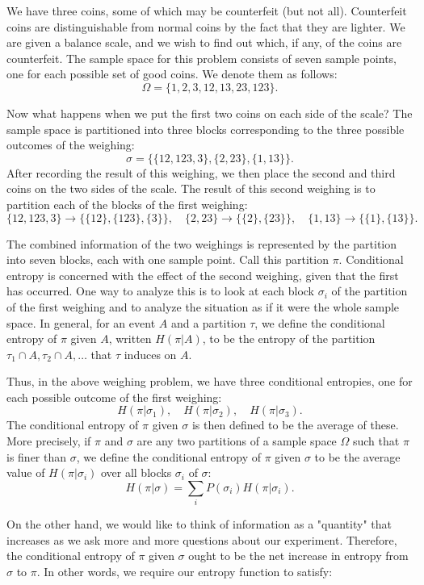 \documentclass{report}
\begin{document}
We have three coins, some of which may be counterfeit (but not all). Counterfeit coins are distinguishable from normal coins by the fact that they are lighter. We are given a balance scale, and we wish to find out which, if any, of the coins are counterfeit. The sample space for this problem consists of seven sample points, one for each possible set of good coins. We denote them as follows:
\[
\Omega = \{1, 2, 3, 12, 13, 23, 123\}.
\]

Now what happens when we put the first two coins on each side of the scale? The sample space is partitioned into three blocks corresponding to the three possible outcomes of the weighing:
\[
\sigma = \{\{12, 123, 3\}, \{2, 23\}, \{1, 13\}\}.
\]
After recording the result of this weighing, we then place the second and third coins on the two sides of the scale. The result of this second weighing is to partition each of the blocks of the first weighing:
\[
\{12, 123, 3\} \to \{\{12\}, \{123\}, \{3\}\}, \quad 
\{2, 23\} \to \{\{2\}, \{23\}\}, \quad 
\{1, 13\} \to \{\{1\}, \{13\}\}.
\]

The combined information of the two weighings is represented by the partition into seven blocks, each with one sample point. Call this partition \( \pi \). Conditional entropy is concerned with the effect of the second weighing, given that the first has occurred. One way to analyze this is to look at each block \( \sigma_i \) of the partition of the first weighing and to analyze the situation as if it were the whole sample space. In general, for an event \( A \) and a partition \( \tau \), we define the conditional entropy of \( \pi \) given \( A \), written \( H(\pi|A) \), to be the entropy of the partition \( \tau_1 \cap A, \tau_2 \cap A, \ldots \) that \( \tau \) induces on \( A \). 

Thus, in the above weighing problem, we have three conditional entropies, one for each possible outcome of the first weighing:
\[
H(\pi|\sigma_1), \quad H(\pi|\sigma_2), \quad H(\pi|\sigma_3).
\]
The conditional entropy of \( \pi \) given \( \sigma \) is then defined to be the average of these. More precisely, if \( \pi \) and \( \sigma \) are any two partitions of a sample space \( \Omega \) such that \( \pi \) is finer than \( \sigma \), we define the conditional entropy of \( \pi \) given \( \sigma \) to be the average value of \( H(\pi|\sigma_i) \) over all blocks \( \sigma_i \) of \( \sigma \):
\[
H(\pi|\sigma) = \sum_i P(\sigma_i) H(\pi|\sigma_i).
\]

On the other hand, we would like to think of information as a "quantity" that increases as we ask more and more questions about our experiment. Therefore, the conditional entropy of \( \pi \) given \( \sigma \) ought to be the net increase in entropy from \( \sigma \) to \( \pi \). In other words, we require our entropy function to satisfy:
\end{document}
